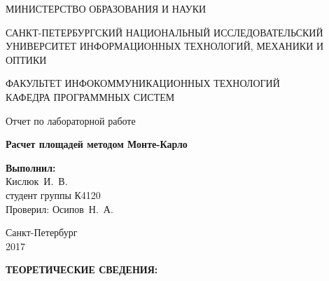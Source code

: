 \documentclass[14pt,a4paper]{extreport}
\newcommand{\header}[1]{%
{
\clearpage%
\fontsize{16pt}{14pt}\selectfont
\begin{center}
\textbf{\MakeUppercase{#1}:}
\end{center}
}
}
\newcommand{\labyear}{2017}
\newcommand{\labtitle}{Расчет площадей методом Монте-Карло}
\newcommand{\prepod}{Осипов~Н.~А.}
\newcommand{\student}{Кислюк~И.~В.}
\begin{document}
	\begin{titlepage}
	\begin{center}	
		\fontsize{14pt}{14pt}\selectfont
		МИНИСТЕРСТВО ОБРАЗОВАНИЯ И НАУКИ\\

		\vspace*{0.6\baselineskip}

		\MakeUppercase{Санкт-Петербургский Национальный Исследовательский Университет Информационных технологий, механики и оптики}		
		
		\vspace*{0.6\baselineskip}
		\MakeUppercase{Факультет Инфокоммуникационных технологий}\\
		\MakeUppercase{Кафедра программных систем}
	
		\vspace*{7\baselineskip}
		\fontsize{19pt}{18pt}\selectfont
		Отчет по лабораторной работе
		
		\fontsize{20pt}{18pt}\selectfont
		\textbf{\labtitle}\\
		\vspace*{1.15\baselineskip}
		\end{center}
	
	\vspace*{2\baselineskip}
	\begin{flushright}
	\fontsize{14pt}{14pt}\selectfont
	\textbf{Выполнил:}\\
	\student\\
	студент группы К4120\\
	Проверил: \prepod\\
	\end{flushright}
	
	\vspace{\fill}
	\begin{center}
	Санкт-Петербург\\
	\vspace{-1ex}
	\labyear
	\end{center}
	
\end{titlepage}

\fontsize{14pt}{14pt}\selectfont

\header{Теоретические сведения}
\end{document}
